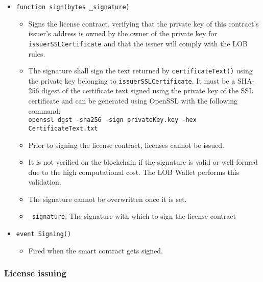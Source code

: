 \documentclass[a4paper]{article}
\begin{document}
\begin{itemize}
  \item \texttt{function sign(bytes \_signature)}
  \begin{itemize}
    \item Signs the license contract, verifying that the private key of this contract's issuer's address is owned by the owner of the private key for \texttt{issuerSSLCertificate} and that the issuer will comply with the LOB rules.
    \item The signature shall sign the text returned by \texttt{certificateText()} using the private key belonging to \texttt{issuerSSLCertificate}. It must be a SHA-256 digest of the certificate text signed using the private key of the SSL certificate and can be generated using OpenSSL with the following command: \\\texttt{openssl dgst -sha256 -sign privateKey.key -hex CertificateText.txt}
    \item Prior to signing the license contract, licenses cannot be issued.
    \item It is not verified on the blockchain if the signature is valid or well-formed due to the high computational cost. The LOB Wallet performs this validation.
    \item The signature cannot be overwritten once it is set.
    \item \texttt{\_signature}: The signature with which to sign the license contract
  \end{itemize}
  
  \item \texttt{event Signing()}
  \begin{itemize}
    \item Fired when the smart contract gets signed.
  \end{itemize}
\end{itemize}

\subsubsection{License issuing}
\end{document}
